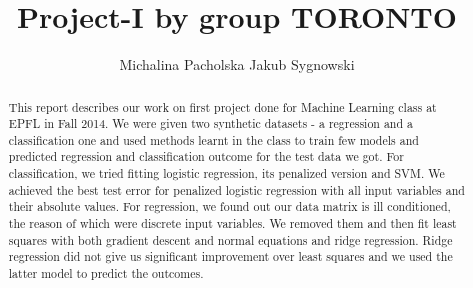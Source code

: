 \documentclass{article}
\title{Project-I by group TORONTO}
\author{Michalina Pacholska \And Jakub Sygnowski}
\begin{document}
\maketitle
\begin{abstract}
This report describes our work on first project done for Machine Learning class at EPFL in Fall 2014. We were given two synthetic datasets - a regression and a classification one and used methods learnt in the class to train few models and predicted regression and classification outcome for the test data we got. For classification, we tried fitting logistic regression, its penalized version and SVM. We achieved the best test error for penalized logistic regression with all input variables and their absolute values. For regression, we found out our data matrix is ill conditioned, the reason of which were discrete input variables. We removed them and then fit least squares with both gradient descent and normal equations and ridge regression. Ridge regression did not give us significant improvement over least squares and we used the latter model to predict the outcomes.
\end{abstract}
\end{document}
